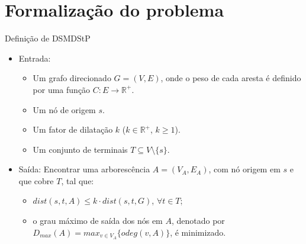 \documentclass[10pt]{beamer}
\begin{document}
\section{Formalização do problema}


\begin{frame}{Definição de DSMDStP}
  \begin{itemize}
    \item Entrada:
    \begin{itemize}
      \item Um grafo direcionado $G = (V,E)$, onde o peso de cada aresta é definido por uma função $C: E \rightarrow \mathbb{R}^+$.
      \item Um nó de origem $s$.
      \item Um fator de dilatação $k$ ($k \in \mathbb{R}^+$, $k \ge 1$).
      \item Um conjunto de terminais $T \subseteq V \setminus \lbrace s \rbrace$.
    \end{itemize}
    \item Saída: Encontrar uma arborescência $A=(V_A, E_A)$, com nó origem em $s$ e que cobre $T$, tal que:
    \begin{itemize}
      \item $dist(s,t,A) \le k \cdot dist(s,t,G)$, $\forall t \in T$;
      \item o grau máximo de saída dos nós em $A$, denotado por $D_{max}(A)=max_{v \in V_A}\{odeg(v, A)\}$, é minimizado.
    \end{itemize}
  \end{itemize}
\end{frame}
\end{document}
